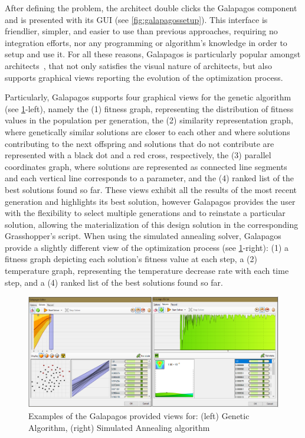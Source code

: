 	After defining the problem, the architect double clicks the Galapagos component and is presented with its \ac{GUI} (see \cref{fig:galapagossetup}). This interface is friendlier, simpler, and easier to use than previous approaches, requiring no integration efforts, nor any programming or algorithm's knowledge in order to setup and use it. For all these reasons, Galapagos is particularly popular amongst architects~\cite{Wortmann2017ADO}, that not only satisfies the visual nature of architects, but also supports graphical views reporting the evolution of the optimization process. 

	Particularly, Galapagos supports four graphical views for the genetic algorithm (see \cref{fig:galapagosvisualmenu}-left), namely the (1) fitness graph, representing the distribution of fitness values in the population per generation, the (2) similarity representation graph, where genetically similar solutions are closer to each other and where solutions contributing to the next offspring and solutions that do not contribute are represented with a black dot and a red cross, respectively, the (3) parallel coordinates graph, where solutions are represented as connected line segments and each vertical line corresponds to a parameter, and the (4) ranked list of the best solutions found so far. These views exhibit all the results of the most recent generation and highlights its best solution, however Galapagos provides the user with the flexibility to select multiple generations and to reinstate a particular solution, allowing the materialization of this design solution in the corresponding Grasshopper's script. When using the simulated annealing solver, Galapagos provide a slightly different view of the optimization process (see \cref{fig:galapagosvisualmenu}-right): (1) a fitness graph depicting each solution's fitness value at each step, a (2) temperature graph, representing the temperature decrease rate with each time step, and a (4) ranked list of the best solutions found so far.
	
\begin{figure}
\centering
\includegraphics[width=\textwidth]{Images/Background/Galapagos/galapagos-results.PNG}
\caption[Galapagos optimization results view]{Examples of the Galapagos provided views for: (left) Genetic Algorithm, (right) Simulated Annealing algorithm}
\label{fig:galapagosvisualmenu}
\end{figure}

